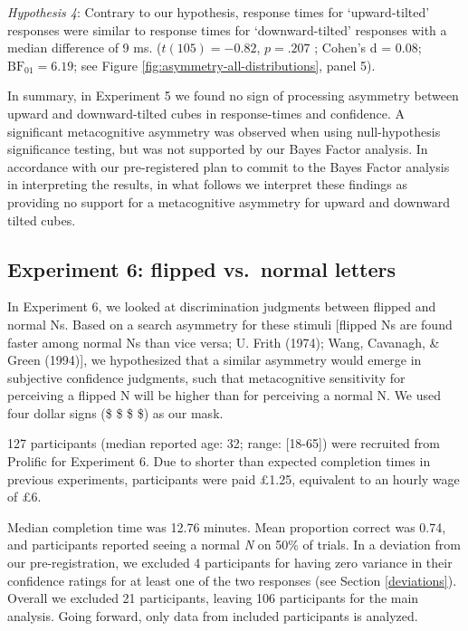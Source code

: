 \documentclass[12pt,twoside]{reedthesis}
\begin{document}
\emph{Hypothesis 4}: Contrary to our hypothesis, response times for `upward-tilted' responses were similar to response times for `downward-tilted' responses with a median difference of 9 ms. (\(t(105) = -0.82\), \(p = .207\) ; Cohen's d = 0.08; \(\mathrm{BF}_{\textrm{01}} = 6.19\); see Figure \ref{fig:asymmetry-all-distributions}, panel 5).

In summary, in Experiment 5 we found no sign of processing asymmetry between upward and downward-tilted cubes in response-times and confidence. A significant metacognitive asymmetry was observed when using null-hypothesis significance testing, but was not supported by our Bayes Factor analysis. In accordance with our pre-registered plan to commit to the Bayes Factor analysis in interpreting the results, in what follows we interpret these findings as providing no support for a metacognitive asymmetry for upward and downward tilted cubes.

\hypertarget{experiment-6-flipped-vs.-normal-letters}{%
\subsection{Experiment 6: flipped vs.~normal letters}\label{experiment-6-flipped-vs.-normal-letters}}

In Experiment 6, we looked at discrimination judgments between flipped and normal Ns. Based on a search asymmetry for these stimuli {[}flipped Ns are found faster among normal Ns than vice versa; U. Frith (1974); Wang, Cavanagh, \& Green (1994){]}, we hypothesized that a similar asymmetry would emerge in subjective confidence judgments, such that metacognitive sensitivity for perceiving a flipped N will be higher than for perceiving a normal N. We used four dollar signs (\$ \$ \$ \$) as our mask.

127 participants (median reported age: 32; range: {[}18-65{]}) were recruited from Prolific for Experiment 6. Due to shorter than expected completion times in previous experiments, participants were paid £1.25, equivalent to an hourly wage of £6.

Median completion time was 12.76 minutes. Mean proportion correct was 0.74, and participants reported seeing a normal \emph{N} on 50\% of trials. In a deviation from our pre-registration, we excluded 4 participants for having zero variance in their confidence ratings for at least one of the two responses (see Section \ref{deviations}). Overall we excluded 21 participants, leaving 106 participants for the main analysis. Going forward, only data from included participants is analyzed.
\end{document}
